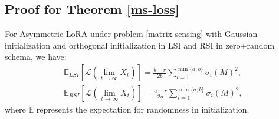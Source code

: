 \subsection{Proof for Theorem \ref{ms-loss}}
\label{ms-loss-proof}
\begin{theorem}
    For Asymmetric LoRA under problem \ref{matrix-sensing} with Gaussian initialization and orthogonal initialization in LSI and RSI in zero+random schema, we have:
    \begin{align*}
        \mathbb{E}_{LSI}\left[\mathcal{L}(\lim_{t\to\infty}X_t)\right]=\frac{b-r}{2b}\sum_{i=1}^{\min\{a,b\}}\sigma_i(M)^2,\\
        \mathbb{E}_{RSI}\left[\mathcal{L}(\lim_{t\to\infty}X_t)\right]=\frac{a-r}{2a}\sum_{i=1}^{\min\{a,b\}}\sigma_i(M)^2,
    \end{align*}
    where $\mathbb{E}$ represents the expectation for randomness in initialization. 
\end{theorem}
